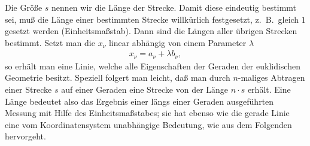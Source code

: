 Die Größe $s$ nennen wir die Länge der Strecke. Damit diese eindeutig bestimmt 
sei, muß die Länge einer bestimmten Strecke willkürlich festgesetzt, z.\ B.\ 
gleich $1$ gesetzt werden (Einheitsmaßstab). Dann sind die Längen aller übrigen 
Strecken bestimmt. Setzt man die $x_\nu$ linear abhängig von einem Parameter 
$\lambda$
\begin{align*}
	x_{\nu} = a_{\nu} + \lambda b_{\nu},
\end{align*}
so erhält man eine Linie, welche alle Eigenschaften der Geraden der euklidischen 
Geometrie besitzt. Speziell folgert man leicht, daß man durch $n$-maliges 
Abtragen einer Strecke $s$ auf einer Geraden eine Strecke von der Länge $n 
\cdot s$ erhält. Eine Länge bedeutet also das Ergebnis einer längs einer 
Geraden ausgeführten Messung mit Hilfe des Einheitsmaßstabes; sie hat ebenso 
wie die gerade Linie eine vom Koordinatensystem unabhängige Bedeutung, wie aus 
dem Folgenden hervorgeht.

